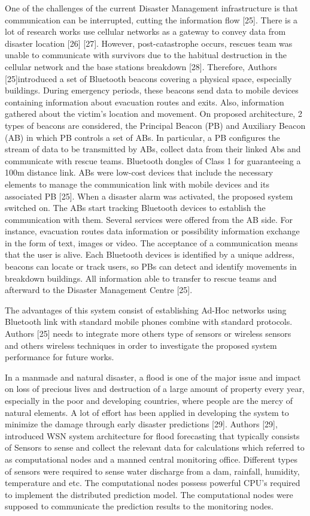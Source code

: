 \documentclass{article}
\begin{document}
One of the challenges of the current Disaster Management infrastructure is that communication can be interrupted, cutting the information flow [25]. There is a lot of research works use cellular networks as a gateway to convey data from disaster location [26] [27]. However, post-catastrophe occurs, rescues team was unable to communicate with survivors due to the habitual destruction in the cellular network and the base stations breakdown [28]. Therefore, Authors [25]introduced a set of Bluetooth beacons covering a physical space, especially buildings. During emergency periods, these beacons send data to mobile devices containing information about evacuation routes and exits. Also, information gathered about the victim’s location and movement. On proposed architecture, 2 types of beacons are considered, the Principal Beacon (PB) and Auxiliary Beacon (AB) in which PB controls a set of ABs. In particular, a PB configures the stream of data to be transmitted by ABs, collect data from their linked Abs and communicate with rescue teams. Bluetooth dongles of Class 1 for guaranteeing a 100m distance link. ABs were low-cost devices that include the necessary elements to manage the communication link with mobile devices and its associated PB [25]. When a disaster alarm was activated, the proposed system switched on. The ABs start tracking Bluetooth devices to establish the communication with them. Several services were offered from the AB side.
For instance, evacuation routes data information or possibility information exchange in the form of text, images or video. The acceptance of a communication means that the user is alive. Each Bluetooth devices is identified by a unique address, beacons can locate or track users, so PBs can detect and identify movements in breakdown buildings. All information able to transfer to rescue teams and afterward to the Disaster Management Centre [25].

The advantages of this system consist of establishing Ad-Hoc networks using Bluetooth link with standard mobile phones combine with standard protocols. Authors [25] needs to integrate more others type of sensors or wireless sensors and others wireless techniques in order to investigate the proposed system performance for future works.

In a manmade and natural disaster, a flood is one of the major issue and impact on loss of precious lives and destruction of a large amount of property every year, especially in the poor and developing countries, where people are the mercy of natural elements. A lot of effort has been applied in developing the system to minimize the damage through early disaster predictions [29]. Authors [29], introduced WSN system architecture for flood forecasting that typically consists of Sensors to sense and collect the relevant data for calculations which referred to as computational nodes and a manned central monitoring office. Different types of sensors were required to sense water discharge from a dam, rainfall, humidity, temperature and etc. The computational nodes possess powerful CPU’s required to implement the distributed prediction model. The computational nodes were supposed to communicate the prediction results to the monitoring nodes.
\end{document}
